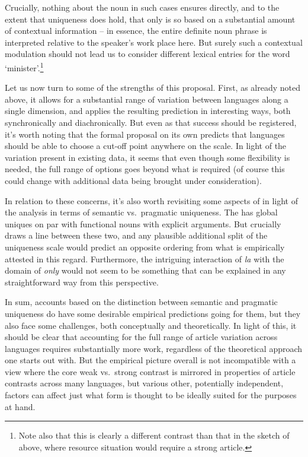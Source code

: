 \documentclass[output=paper
,modfonts
,nonflat]{langscibook}
\begin{document}
Crucially, nothing about the noun in such cases ensures 
directly, and to the extent that uniqueness does hold, that only is so
based on a substantial amount of contextual information -- in essence,
the entire definite noun phrase is interpreted relative to the
speaker's work place here. But surely such a contextual modulation
should not lead us to consider different lexical entries for the word
`minister'.\footnote{Note also that this is clearly a different
  contrast than that in the sketch of  above, where
  resource situation would require a strong article.}


Let us now turn to some of the strengths of this proposal. First, as
already noted above, it allows for a substantial range of variation
between languages along a single dimension, and \citet{Ortmann2014}
applies the resulting prediction in interesting ways, both
synchronically and diachronically. But even as that success should be
registered, it's worth noting that the formal proposal on its own
predicts that languages should be able to choose a cut-off point anywhere
on the scale. In light of the variation present in existing data, it
seems that even though some flexibility is needed, the full range of
options goes beyond what is required (of course this could change with
additional data being brought under consideration). 

In relation to these concerns, it's also worth revisiting some aspects
of  in light of the analysis in terms of semantic vs.\
pragmatic uniqueness. The  has global uniques on par
with \is{nouns}functional nouns with explicit arguments. But 
crucially draws  a line between these two, and any plausible
additional split of the uniqueness scale would predict an opposite
ordering from what is empirically attested in this
regard. Furthermore, the intriguing interaction of \textit{la} with
the domain of \textit{only} would not seem to be something that can be
explained in any straightforward way from this perspective. 

In sum, accounts based on the distinction between semantic and
pragmatic uniqueness do have some desirable empirical predictions going
for them, but they also face some challenges, both conceptually and
theoretically. In light of this, it should be clear that accounting
for the full range of article variation across languages requires
substantially more work, regardless of the theoretical approach one
starts out with. But the empirical picture overall is not
incompatible with a view where the core weak vs.\ strong contrast is
mirrored in properties of article contrasts across many languages, but
various other, potentially independent, factors can affect just what
form is thought to be ideally suited for the purposes at hand.
\end{document}

